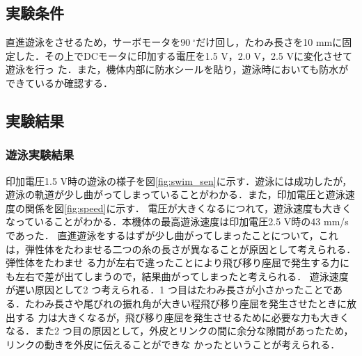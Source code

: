 \subsection{実験条件}
直進遊泳をさせるため，サーボモータを$90\:^\circ$だけ回し，たわみ長さを10 mmに固定した．その上でDCモータに印加する電圧を1.5 V，2.0 V，2.5 Vに変化させて遊泳を行っ
た．また，機体内部に防水シールを貼り，遊泳時においても防水ができているか確認する．

\subsection{実験結果}
\subsubsection{遊泳実験結果}
印加電圧1.5 V時の遊泳の様子を図\ref{fig:swim_sen}に示す．遊泳には成功したが，遊泳の軌道が少し曲がってしまっていることがわかる．また，印加電圧と遊泳速度の関係を図\ref{fig:speed}に示す．
電圧が大きくなるにつれて，遊泳速度も大きくなっていることがわかる．本機体の最高遊泳速度は印加電圧2.5 V時の43 mm/sであった．
直進遊泳をするはずが少し曲がってしまったことについて，これは，弾性体をたわませる二つの糸の長さが異なることが原因として考えられる．弾性体をたわませ
る力が左右で違ったことにより飛び移り座屈で発生する力にも左右で差が出てしまうので，結果曲がってしまったと考えられる．
遊泳速度が遅い原因として2 つ考えられる．1 つ目はたわみ長さが小さかったことである．たわみ長さや尾びれの振れ角が大きい程飛び移り座屈を発生させたときに放出する
力は大きくなるが，飛び移り座屈を発生させるために必要な力も大きくなる．また2 つ目の原因として，外皮とリンクの間に余分な隙間があったため，リンクの動きを外皮に伝えることができな
かったということが考えられる．

